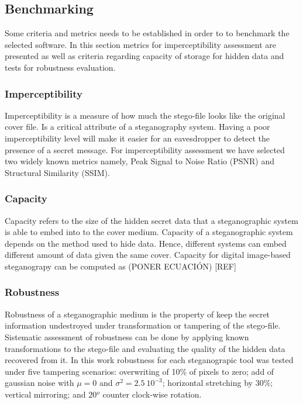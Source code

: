 \documentclass[11pt]{article}
\begin{document}
\subsection{Benchmarking}

Some criteria and metrics needs to be established in order to to benchmark the selected software.
In this section metrics for imperceptibility assessment are presented as well as criteria regarding capacity of storage for
hidden data and tests for robustness evaluation.

\subsubsection{Imperceptibility}

Imperceptibility is a measure of how much the stego-file
looks like the original cover file. Is a critical attribute of a steganography system. Having a poor imperceptibility level will make it 
easier for an eavesdropper to detect the presence of a secret message. For imperceptibility assessment we have selected
two widely known metrics namely, Peak Signal to Noise Ratio (PSNR) and Structural Similarity (SSIM).

\subsubsection{Capacity}

Capacity refers to the size of the hidden secret data that a steganographic system is able to embed into to the cover
medium. Capacity of a steganographic system depends on the method used to hide data. Hence, different systems can embed
different amount of data given the same cover. Capacity for digital image-based steganograpy can be computed as 
(PONER ECUACIÓN) [REF]


\subsubsection{Robustness}

Robustness of a steganographic medium is the property of keep the secret information undestroyed under transformation or 
tampering of the stego-file. Sistematic assessment of robustness can be done by applying known transformations to the stego-file
and evaluating the quality of the hidden data recovered from it. In this work robustness for each steganograpic tool 
was tested under five tampering scenarios: overwriting of 10\% of pixels to zero; add of gaussian noise with $\mu = 0$ and $\sigma^2 = 2.5\ 10^{-3}$; horizontal
stretching by 30\%; vertical mirroring; and 20$^o$ counter clock-wise rotation.
\end{document}
